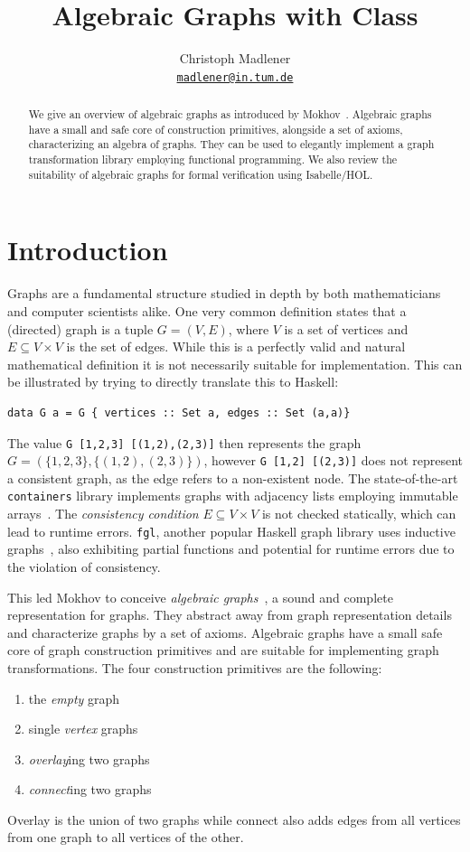 \documentclass{article}
\title{Algebraic Graphs with Class}
\author{
  Christoph Madlener\\
  \texttt{\href{mailto:madlener@in.tum.de}{madlener@in.tum.de}}
}
\newcommand{\hs}{\texttt}
\begin{document}
\maketitle
\begin{abstract}
  We give an overview of algebraic graphs as introduced by
  Mokhov~\cite{mokhov2017algebraic}. Algebraic graphs have a small and safe core
  of construction primitives, alongside a set of axioms, characterizing an
  algebra of graphs. They can be used to elegantly implement a graph
  transformation library employing functional programming. We also review the
  suitability of algebraic graphs for formal verification using Isabelle/HOL.
\end{abstract}

\section{Introduction}\label{sec:intro}
Graphs are a fundamental structure studied in depth by both mathematicians and
computer scientists alike. One very common definition states that a (directed)
graph is a tuple $G = (V,E)$, where $V$ is a set of vertices and $E \subseteq V
\times V$ is the set of edges. While this is a perfectly valid and natural
mathematical definition it is not necessarily suitable for implementation. This
can be illustrated by trying to directly translate this to Haskell:
\begin{verbatim}
data G a = G { vertices :: Set a, edges :: Set (a,a)}
\end{verbatim}
The value \hs{G [1,2,3] [(1,2),(2,3)]} then represents the graph $G =
(\{1,2,3\}, \{(1,2),(2,3)\})$, however \hs{G [1,2] [(2,3)]} does not
represent a consistent graph, as the edge refers to a non-existent node.
The state-of-the-art \texttt{containers} library implements graphs with
adjacency lists employing immutable arrays~\cite{king1995dfs}. The
\emph{consistency condition} $E \subseteq V \times V$ is not checked statically,
which can lead to runtime errors. \texttt{fgl}, another popular Haskell graph
library uses inductive graphs~\cite{erwig2001inductive}, also exhibiting partial
functions and potential for runtime errors due to the violation of consistency.

This led Mokhov to conceive \textit{algebraic
  graphs}~\cite{mokhov2017algebraic}, a sound and complete representation for
graphs. They abstract away from graph representation details and characterize
graphs by a set of axioms. Algebraic graphs have a small safe core of graph
construction primitives and are suitable for implementing graph transformations.
The four construction primitives are the following:
\begin{enumerate}
\item the \emph{empty} graph
\item single \emph{vertex} graphs
\item \emph{overlay}ing two graphs
\item \emph{connect}ing two graphs
\end{enumerate}
Overlay is the union of two graphs while connect also adds
edges from all vertices from one graph to all vertices of the other. 
\end{document}
